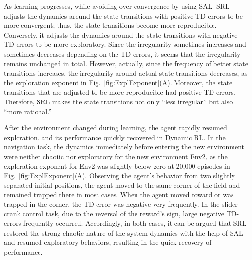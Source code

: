 As learning progresses, while avoiding over-convergence by using SAL,
SRL adjusts the dynamics around the state transitions with positive TD-errors to be more convergent;
thus, the state transitions become more reproducible.
Conversely, it adjusts the dynamics around the state transitions with negative TD-errors to be more exploratory.
Since the irregularity sometimes increases and sometimes decreases depending on the TD-errors,
it seems that the irregularity remains unchanged in total.
However, actually, since the frequency of better state transitions increases,
the irregularity around actual state transitions decreases,
as the exploration exponent in Fig.~\ref{fig:ExplExponent}(A).
Moreover, the state transitions that are adjusted to be more reproducible had positive TD-errors.
Therefore, SRL makes the state transitions not only ``less irregular'' but also ``more rational.''

After the environment changed during learning, the agent rapidly resumed exploration,
and its performance quickly recovered in Dynamic RL. 
In the navigation task, the dynamics immediately before entering the new environment were neither chaotic nor exploratory
for the new environment Env2,
as the exploration exponent for Env2 was slightly below zero at 20,000 episodes in Fig.~\ref{fig:ExplExponent}(A).
Observing the agent's behavior from two slightly separated initial positions, 
the agent moved to the same corner of the field and remained trapped there in most cases.
When the agent moved toward or was trapped in the corner, 
the TD-error was negative very frequently.
In the slider-crank control task, due to the reversal of the reward's sign, large negative TD-errors frequently occurred. 
Accordingly, in both cases, it can be argued that SRL restored the strong chaotic nature of the system dynamics
with the help of SAL and resumed exploratory behaviors,
resulting in the quick recovery of performance.

